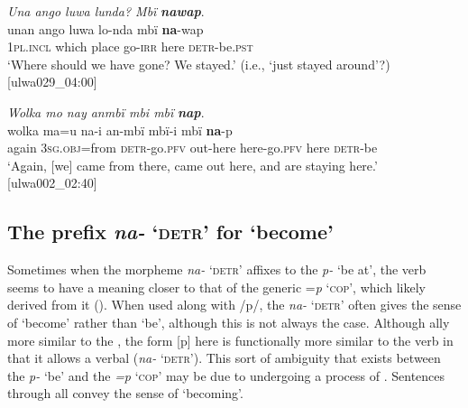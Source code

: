 \ea%
    \label{ex:syntax:323}
          \textit{Una ango luwa lunda? Mbï} \textbf{\textit{nawap}}.\\
\gll unan    ango  luwa  lo-nda  mbï  \textbf{na}{}-wap\\
    1\textsc{pl.incl}  which  place  go-\textsc{irr}  here  \textsc{detr}{}-be.\textsc{pst}\\
\glt `Where should we have gone? We stayed.’ (i.e., ‘just stayed around’?) [ulwa029\_04:00]
\z

\ea%
    \label{ex:syntax:324}
          \textit{Wolka mo nay anmbï mbi mbï} \textbf{\textit{nap}}.\\
\gll wolka  ma=u      na-i      an-mbï    mbï-i      mbï     \textbf{na}{}-p\\
    again  3\textsc{sg.obj}=from  \textsc{detr}{}-go.\textsc{pfv}  out-here  here-go\textsc{.pfv}  here    \textsc{detr}{}-be\\
\glt `Again, [we] came from there, came out here, and are staying here.’ [ulwa002\_02:40]
\z

\subsection{The prefix \textit{na-} ‘\textsc{detr}’ for ‘become’}\label{sec:13.8.6}


Sometimes when the morpheme \textit{na-} \textsc{‘detr’} affixes to the  \textit{p-} ‘be at’, the verb seems to have a meaning closer to that of the generic  =\textit{p} ‘\textsc{cop}’, which likely derived from it (). When used along with /p/, the  \textit{na-} \textsc{‘detr’} often gives the sense of ‘become’ rather than ‘be’, although this is not always the case. Although ally more similar to the , the form [p] here is functionally more similar to the verb in that it allows a verbal  (\textit{na-} ‘\textsc{detr’}). This sort of ambiguity that exists between the  \textit{p-} ‘be’ and the  \textit{=p} ‘\textsc{cop}’ may be due to undergoing a process of . Sentences  through  all convey the sense of ‘becoming’.



